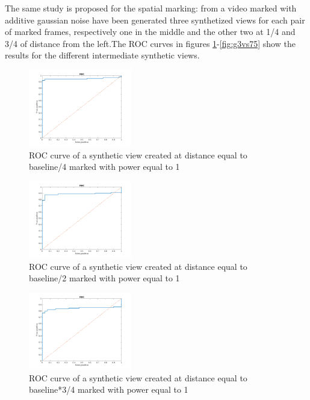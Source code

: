   
The same study is proposed for the spatial marking: from a video marked with additive gaussian noise have been generated three synthetized views for each pair of marked frames, respectively one in the middle and the other two at 1/4 and 3/4 of distance from the left.\newline The ROC curves in figures \ref{fig:g1vs25}-\ref{fig:g3vs75}  show the results for the different intermediate synthetic views.\newline 
\begin{figure}[h!]
\centering
\includegraphics[width=0.4\textwidth]{./img/ROC/ROC_gauss_synt_1_25.png}
\caption{\small{ROC curve of a synthetic view created at distance equal to baseline/4 marked with power equal to 1 }}
\label{fig:g1vs25}
\end{figure}
\begin{figure}[h!]
\centering
\includegraphics[width=0.4\textwidth]{./img/ROC/ROC_gauss_synt_1_50.png}
\caption{\small{ROC curve of a synthetic view created at distance equal to baseline/2 marked with power equal to 1 }}
\label{fig:g1vs50}
\end{figure}
\begin{figure}[h!]
\centering
\includegraphics[width=0.4\textwidth]{./img/ROC/ROC_gauss_synt_1_75.png}
\caption{\small{ROC curve of a synthetic view created at distance equal to baseline*3/4 marked with power equal to 1 }}
\label{fig:g1vs75}
\end{figure}
